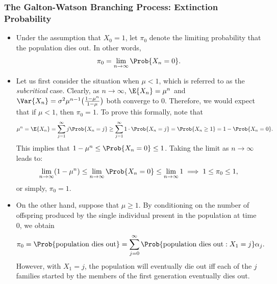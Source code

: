 \subsubsection{The Galton-Watson Branching Process: Extinction Probability}
\begin{itemize}
      \item Under the assumption that $ X_0=1 $, let $ \pi_0 $ denote the limiting probability that the population dies out.
            In other words,
            \[ \pi_0=\lim\limits_{{n} \to {\infty}} \Prob{X_n=0}. \]
      \item Let us first consider the situation when $ \mu<1 $, which is referred to as the \emph{subcritical} case.
            Clearly, as $ n\to\infty $, $ \E{X_n}=\mu^n $ and $ \Var{X_n}=\sigma^2\mu^{n-1}\bigl(\frac{1-\mu^n}{1-\mu}\bigr) $ both converge to $ 0 $.
            Therefore, we would expect that if $ \mu<1 $, then $ \pi_0=1 $. To prove this formally, note that
            \[ \mu^n=\E{X_n}=\sum_{j=1}^{\infty} j\Prob{X_n=j}\ge \sum_{j=1}^{\infty} 1\cdot \Prob{X_n=j}=\Prob{X_n\ge 1}=1-\Prob{X_n=0}. \]
            This implies that $ 1-\mu^n\le \Prob{X_n=0}\le 1 $. Taking the limit as $ n\to\infty $ leads to:
            \[ \lim\limits_{{n} \to {\infty}} (1-\mu^n)\le \lim\limits_{{n} \to {\infty}} \Prob{X_n=0}\le \lim\limits_{{n} \to {\infty}} 1\implies 1\le \pi_0\le 1, \]
            or simply, $ \pi_0=1 $.
      \item On the other hand, suppose that $ \mu\ge 1 $. By conditioning on the number of offspring produced
            by the single individual present in the population at time $0$, we obtain
            \[ \pi_0=\Prob{\text{population dies out}}=\sum_{j=0}^{\infty} \Prob{\text{population dies out}\given X_1=j}\alpha_j. \]
            However, with $ X_1=j $, the population will eventually die out iff each of the $j$ families started
            by the members of the first generation eventually dies out.


\end{itemize}
